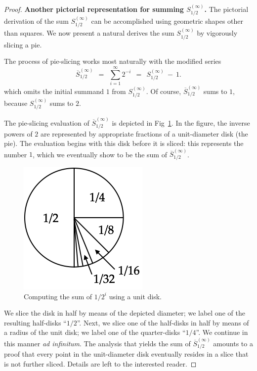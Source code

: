 \begin{proof}
{\bf Another pictorial representation for summing $S^{(\infty)}_{1/2}$.}
%
The pictorial derivation of the sum $S^{(\infty)}_{1/2}$ can be
accomplished using geometric shapes other than squares.  We now
present a natural derives the sum $S^{(\infty)}_{1/2}$ by vigorously
slicing a pie.

The process of pie-slicing works most naturally with the modified
series
\[ \overline{S}^{(\infty)}_{1/2} \ \ = \ \ \sum_{i=1}^\infty 2^{-i}
 \ \ = \ \ S^{(\infty)}_{1/2} \ - \ 1. \]
which omits the initial summand $1$ from $S^{(\infty)}_{1/2}$.  Of
course, $\overline{S}^{(\infty)}_{1/2}$ sums to $1$, because
$S^{(\infty)}_{1/2}$ sums to $2$.

The pie-slicing evaluation of $\overline{S}^{(\infty)}_{1/2}$ is depicted
in Fig~\ref{fig:sumGeo1sur2circle}.  In the figure, the inverse powers
of $2$ are represented by appropriate fractions of a unit-diameter
disk (the pie).  The evaluation begins with this disk before it is
sliced: this represents the number $1$, which we eventually show to be
the sum of $\overline{S}^{(\infty)}_{1/2}$.
\begin{figure}[ht]
\begin{center}
       \includegraphics[scale=0.4]{FiguresMaths/SumGeometric1sur2circle}
\caption{Computing the sum of $1/2^i$ using a unit disk.}
       \label{fig:sumGeo1sur2circle}
\end{center}
\end{figure}
We slice the disk in half by means of the depicted diameter; we label
one of the resulting half-disks ``$1/2$''.  Next, we slice one of the
half-disks in half by means of a radius of the unit disk; we label one
of the quarter-disks ``$1/4$''.  We continue in this manner {\em ad
  infinitum}.  The analysis that yields the sum of
$\overline{S}^{(\infty)}_{1/2}$ amounts to a proof that every point in the
unit-diameter disk eventually resides in a slice that is not further
sliced.  Details are left to the interested reader.
\end{proof}

